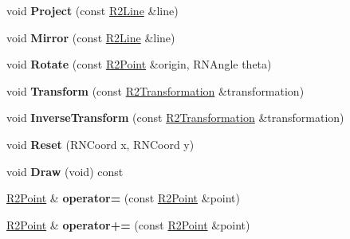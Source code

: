 \begin{DoxyCompactItemize}
\item 
void {\bfseries Project} (const \hyperlink{class_r2_line}{R2\+Line} \&line)\hypertarget{class_r2_point_a54a5685d7221ce10b90a7a02f1f1bf35}{}\label{class_r2_point_a54a5685d7221ce10b90a7a02f1f1bf35}

\item 
void {\bfseries Mirror} (const \hyperlink{class_r2_line}{R2\+Line} \&line)\hypertarget{class_r2_point_abafdda83383c7603e4d4ab1b9fc4017f}{}\label{class_r2_point_abafdda83383c7603e4d4ab1b9fc4017f}

\item 
void {\bfseries Rotate} (const \hyperlink{class_r2_point}{R2\+Point} \&origin, R\+N\+Angle theta)\hypertarget{class_r2_point_a09276fc168b01ef59a2874f568633627}{}\label{class_r2_point_a09276fc168b01ef59a2874f568633627}

\item 
void {\bfseries Transform} (const \hyperlink{class_r2_transformation}{R2\+Transformation} \&transformation)\hypertarget{class_r2_point_a30cc844ac8ba53a32522bfbef8e92d77}{}\label{class_r2_point_a30cc844ac8ba53a32522bfbef8e92d77}

\item 
void {\bfseries Inverse\+Transform} (const \hyperlink{class_r2_transformation}{R2\+Transformation} \&transformation)\hypertarget{class_r2_point_a0285012c6f1268a0265dab04e4dc0095}{}\label{class_r2_point_a0285012c6f1268a0265dab04e4dc0095}

\item 
void {\bfseries Reset} (R\+N\+Coord x, R\+N\+Coord y)\hypertarget{class_r2_point_a57a5416d6c2870214ec3ec455903e37c}{}\label{class_r2_point_a57a5416d6c2870214ec3ec455903e37c}

\item 
void {\bfseries Draw} (void) const \hypertarget{class_r2_point_abe9aed0da8edb0c8d0ef21f2cccc5b97}{}\label{class_r2_point_abe9aed0da8edb0c8d0ef21f2cccc5b97}

\item 
\hyperlink{class_r2_point}{R2\+Point} \& {\bfseries operator=} (const \hyperlink{class_r2_point}{R2\+Point} \&point)\hypertarget{class_r2_point_a6695b38044dd7bcf92666b1ea2124a62}{}\label{class_r2_point_a6695b38044dd7bcf92666b1ea2124a62}

\item 
\hyperlink{class_r2_point}{R2\+Point} \& {\bfseries operator+=} (const \hyperlink{class_r2_point}{R2\+Point} \&point)\hypertarget{class_r2_point_ae8c6ef4e4eaaa9e5028014e34b5286fe}{}\label{class_r2_point_ae8c6ef4e4eaaa9e5028014e34b5286fe}


\end{DoxyCompactItemize}
